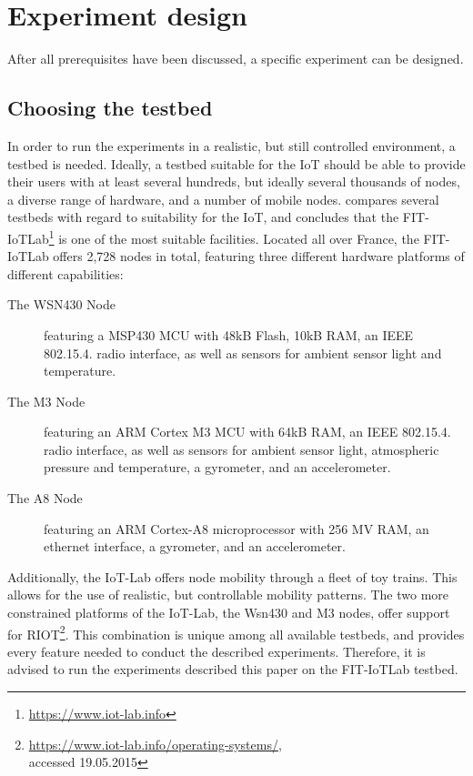 \documentclass{acm_proc_article-sp}
\begin{document}
\section{Experiment design}
\label{sec:Design}
After all prerequisites have been discussed, a specific experiment can be designed.

\subsection{Choosing the testbed}
\label{subsec:testbed_choice}
In order to run the experiments in a realistic, but still controlled environment, a testbed is needed. Ideally, a testbed suitable for the IoT should be able to provide their users with at least several hundreds, but ideally several thousands of nodes, a diverse range of hardware, and a number of mobile nodes. \cite{testbed-survey} compares several testbeds with regard to suitability for the IoT, and concludes that the FIT-IoTLab\footnote{ \url{https://www.iot-lab.info}} is one of the most suitable facilities. Located all over France, the FIT-IoTLab offers 2,728 nodes in total, featuring three different hardware platforms of different capabilities:
\begin{description}
\item[The WSN430 Node] featuring a MSP430 MCU with 48kB Flash, 10kB RAM, an IEEE 802.15.4. radio interface, as well as sensors for ambient sensor light and temperature.
\item[The M3 Node] featuring an ARM Cortex M3 MCU with 64kB RAM, an IEEE 802.15.4. radio interface, as well as sensors for ambient sensor light, atmospheric pressure and temperature, a gyrometer, and an accelerometer.
\item[The A8 Node] featuring an ARM Cortex-A8 microprocessor with 256 MV RAM, an ethernet interface, a gyrometer, and an accelerometer.
\end{description}
Additionally, the IoT-Lab offers node mobility through a fleet of toy trains. This allows for the use of realistic, but controllable mobility patterns.
The two more constrained platforms of the IoT-Lab, the Wsn430 and M3 nodes, offer support for RIOT\cite{riot}\footnote{ \url{https://www.iot-lab.info/operating-systems/}, \\accessed 19.05.2015}.
This combination is unique among all available testbeds, and provides every feature needed to conduct the described experiments. Therefore, it is advised to run the experiments described this paper on the FIT-IoTLab testbed.
\end{document}

